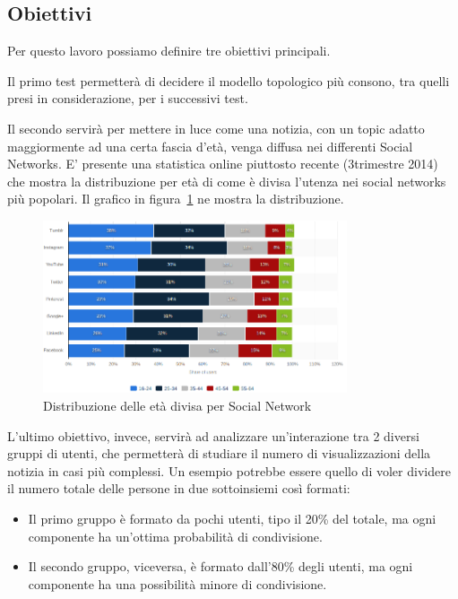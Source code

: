 \subsection{Obiettivi}
\label{section:obiettivi}

Per questo lavoro possiamo definire tre obiettivi principali.

Il primo test permetterà di decidere il modello topologico più consono, tra quelli 
presi in considerazione, per i successivi test.

Il secondo servirà per mettere in luce come una notizia, 
con un topic adatto maggiormente ad una certa fascia d'età, venga diffusa nei differenti Social Networks.
E' presente una statistica online piuttosto recente (3\degree trimestre 2014) che mostra la distribuzione 
per età di come è divisa l'utenza nei social networks più popolari. 
Il grafico in figura~\ref{img:age_distribution_social} ne mostra la distribuzione.

\begin{figure}[!ht]
 \centerline{
  \includegraphics[width=0.8\textwidth]{img/age-distribution.png}
 }
\caption{Distribuzione delle età divisa per Social Network ~\cite{biblio:age_distribution_social}}
\label{img:age_distribution_social}
\end{figure}


L'ultimo obiettivo, invece, servirà ad analizzare un'interazione tra 2 diversi gruppi di utenti, che 
permetterà di studiare il numero di visualizzazioni della notizia in casi più complessi.
Un esempio potrebbe essere quello di voler dividere il numero totale delle persone in due sottoinsiemi così formati:
\begin{itemize}
 \item Il primo gruppo è formato da pochi utenti, tipo il 20\% del totale, ma ogni componente ha un'ottima probabilità di condivisione.
 \item Il secondo gruppo, viceversa, è formato dall'80\% degli utenti, ma ogni componente ha una possibilità minore di condivisione.
\end{itemize}





